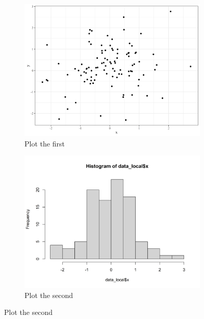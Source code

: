 \documentclass[]{elsarticle} %
\begin{document}
\begin{figure}[h]
\begin{multicols}{2}
\begin{figure}[H]
\includegraphics[width = \linewidth]{mandatory_chunk_name-1.png}
\caption{Plot the first}
\label{fig:plotmeans}
\end{figure}

\columnbreak

\begin{figure}[H]
\includegraphics[width = \linewidth]{mandatory_chunk_name-2.png}
\centering
\caption{Plot the second}
\label{fig:histogram}
\end{figure}
\end{multicols}
\end{figure}
\end{document}
